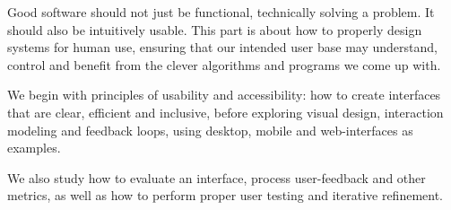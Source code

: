 \begin{itemize}
  Good software should not just be functional, technically solving a problem.
  It should also be intuitively usable. This part is about how to properly
  design systems for human use, ensuring that our intended user base may
  understand, control and benefit from the clever algorithms and programs we
  come up with.

  We begin with principles of usability and accessibility: how to create
  interfaces that are clear, efficient and inclusive, before exploring visual
  design, interaction modeling and feedback loops, using desktop, mobile and
  web-interfaces as examples.

  We also study how to evaluate an interface, process user-feedback and other
  metrics, as well as how to perform proper user testing and iterative
  refinement.
\end{itemize}

